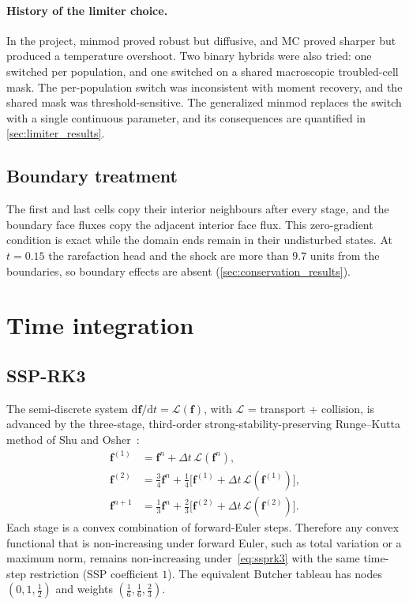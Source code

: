 \documentclass[11pt]{article}
\theoremstyle{remark}
\newcommand{\dd}{\mathrm{d}}
\begin{document}
\paragraph{History of the limiter choice.}  In the project, minmod proved robust but
diffusive, and MC proved sharper but produced a temperature overshoot.  Two binary
hybrids were also tried: one switched per population, and one switched on a shared
macroscopic troubled-cell mask.  The per-population switch was inconsistent with
moment recovery, and the shared mask was threshold-sensitive.  The generalized
minmod replaces the switch with a single continuous parameter, and its
consequences are quantified in \cref{sec:limiter_results}.

\subsection{Boundary treatment}
The first and last cells copy their interior neighbours after every stage, and the
boundary face fluxes copy the adjacent interior face flux.  This zero-gradient
condition is exact while the domain ends remain in their undisturbed states.  At
$t=0.15$ the rarefaction head and the shock are more than $9.7$ units from the
boundaries, so boundary effects are absent (\cref{sec:conservation_results}).

\section{Time integration}
\label{sec:time}

\subsection{SSP-RK3}
The semi-discrete system $\dd\mathbf f/\dd t = \mathcal L(\mathbf f)$, with
$\mathcal L$ = transport + collision, is advanced by the three-stage, third-order
strong-stability-preserving Runge--Kutta method of Shu and
Osher~\citep{ShuOsher1988,Gottlieb2001}:
\begin{align}
  \mathbf f^{(1)} &= \mathbf f^n + \Delta t\,\mathcal L(\mathbf f^n), \nonumber\\
  \mathbf f^{(2)} &= \tfrac34\mathbf f^n + \tfrac14\bigl[\mathbf f^{(1)} + \Delta t\,\mathcal L(\mathbf f^{(1)})\bigr], \label{eq:ssprk3}\\
  \mathbf f^{n+1} &= \tfrac13\mathbf f^n + \tfrac23\bigl[\mathbf f^{(2)} + \Delta t\,\mathcal L(\mathbf f^{(2)})\bigr]. \nonumber
\end{align}
Each stage is a convex combination of forward-Euler steps.  Therefore any convex
functional that is non-increasing under forward Euler, such as total variation or a
maximum norm, remains non-increasing under~\eqref{eq:ssprk3} with the same
time-step restriction (SSP coefficient $1$).  The equivalent Butcher tableau has
nodes $(0,1,\tfrac12)$ and weights $(\tfrac16,\tfrac16,\tfrac23)$.
\end{document}
